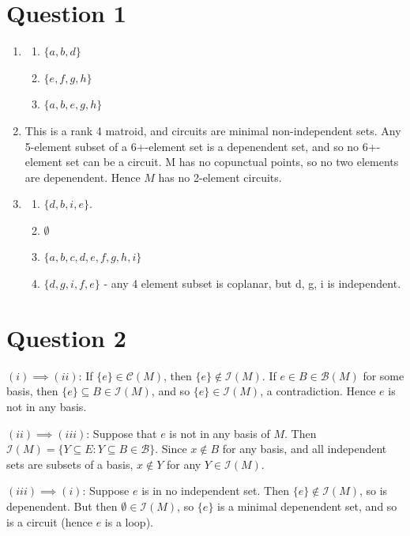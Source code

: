 \documentclass{article}
\author{Ben Shirley}
\begin{document}
\section*{Question 1}

\begin{enumerate}

\item \begin{enumerate}
    \item $\{a, b, d\}$
    \item $\{e, f, g, h\}$
    \item $\{a, b, e, g, h\}$
\end{enumerate}

\item This is a rank 4 matroid, and circuits are minimal non-independent sets. Any 5-element subset of a 6+-element set is a depenendent set, 
    and so no 6+-element set can be a circuit. M has no copunctual points, so no two elements are depenendent. Hence $M$ has no 2-element circuits.
\item 
\begin{enumerate}
    \item $\{d, b, i, e\}$.
    \item $\emptyset$
    \item $\{a, b, c, d, e, f, g, h, i\}$
    \item $\{d, g, i, f, e\}$ - any 4 element subset is coplanar, but d, g, i is independent.
\end{enumerate}
\end{enumerate}
\section*{Question 2}
$(i)\implies (ii)$: If $\{e\}\in\mathcal{C}(M)$, then $\{e\}\not\in\mathcal{I}(M)$. If $e\in B\in\mathcal{B}(M)$ for some basis, 
then $\{e\}\subseteq B\in \mathcal{I}(M)$, and so $\{e\}\in \mathcal{I}(M)$, a contradiction.
Hence $e$ is not in any basis.

$(ii)\implies (iii)$: Suppose that $e$ is not in any basis of $M$. Then $\mathcal{I}(M)=\{Y\subseteq E: Y\subseteq B\in\mathcal{B}\}$.
Since $x\not\in B$ for any basis, and all independent sets are subsets of a basis, $x\not\in Y$ for any $Y\in\mathcal{I}(M)$.

$(iii)\implies (i)$: Suppose $e$ is in no independent set. Then $\{e\}\not\in \mathcal{I}(M)$, so is depenendent. But then $\emptyset\in\mathcal{I}(M)$,
so $\{e\}$ is a minimal depenendent set, and so is a circuit (hence $e$ is a loop).
\end{document}
